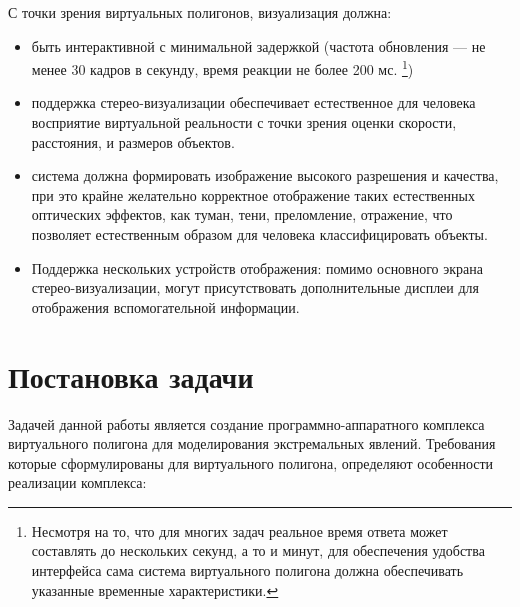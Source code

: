 С точки зрения виртуальных полигонов, визуализация должна:
\begin{itemize}
	\item	быть интерактивной с минимальной задержкой (частота обновления --- не менее 30 кадров в секунду, время реакции не более 200 мс. \footnote{Несмотря на то, что для многих задач реальное время ответа может составлять до нескольких секунд, а то и минут, для обеспечения удобства интерфейса сама система виртуального полигона должна обеспечивать указанные временные характеристики.})
	\item	поддержка стерео-визуализации обеспечивает естественное для человека восприятие 
			виртуальной реальности с точки зрения оценки скорости, расстояния, и размеров объектов.
	\item	система должна формировать изображение высокого разрешения и качества, 
			при это крайне желательно корректное отображение таких естественных оптических эффектов,
			как туман, тени, преломление, отражение, что позволяет естественным образом для 
			человека классифицировать объекты.
	\item	Поддержка нескольких устройств отображения: помимо основного экрана стерео-визуализации, 
			могут присутствовать дополнительные дисплеи для отображения вспомогательной информации.
\end{itemize}



\section{Постановка задачи}
\label{ch1_1_5}
Задачей данной работы является создание программно-аппаратного комплекса виртуального полигона для моделирования экстремальных явлений.
Требования которые сформулированы для виртуального полигона, определяют особенности реализации комплекса:

